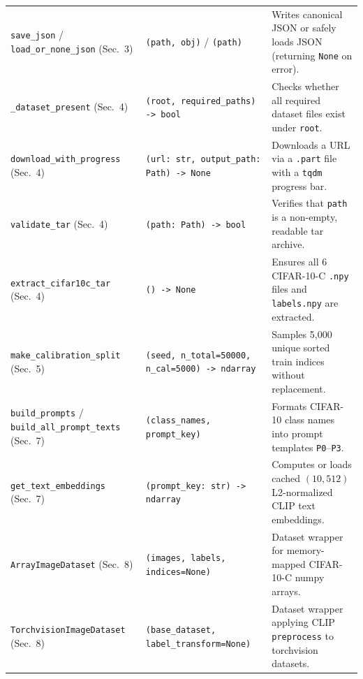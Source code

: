 \documentclass[11pt,a4paper]{article}
\begin{document}
\begin{small}
\begin{longtable}{L{0.29\textwidth} L{0.26\textwidth} L{0.36\textwidth}}
\texttt{save\_\allowbreak{}json} / \texttt{load\_\allowbreak{}or\_\allowbreak{}none\_\allowbreak{}json} (Sec.~3) & \texttt{(\allowbreak{}path,\allowbreak{} obj)} / \texttt{(\allowbreak{}path)} & Writes canonical JSON or safely loads JSON (returning \texttt{None} on error). \\
\texttt{\_\allowbreak{}dataset\_\allowbreak{}present} (Sec.~4) & \texttt{(\allowbreak{}root,\allowbreak{} required\_\allowbreak{}paths) -> bool} & Checks whether all required dataset files exist under \texttt{root}. \\
\texttt{download\_\allowbreak{}with\_\allowbreak{}progress} (Sec.~4) & \texttt{(\allowbreak{}url: str,\allowbreak{} output\_\allowbreak{}path: Path) -> None} & Downloads a URL via a \texttt{.\allowbreak{}part} file with a \texttt{tqdm} progress bar. \\
\texttt{validate\_\allowbreak{}tar} (Sec.~4) & \texttt{(\allowbreak{}path: Path) -> bool} & Verifies that \texttt{path} is a non-empty, readable tar archive. \\
\texttt{extract\_\allowbreak{}cifar10c\_\allowbreak{}tar} (Sec.~4) & \texttt{(\allowbreak{}) -> None} & Ensures all 6 CIFAR-10-C \texttt{.\allowbreak{}npy} files and \texttt{labels.\allowbreak{}npy} are extracted. \\
\texttt{make\_\allowbreak{}calibration\_\allowbreak{}split} (Sec.~5) & \texttt{(\allowbreak{}seed,\allowbreak{} n\_\allowbreak{}total=50000,\allowbreak{} n\_\allowbreak{}cal=5000) -> ndarray} & Samples 5,000 unique sorted train indices without replacement. \\
\texttt{build\_\allowbreak{}prompts} / \texttt{build\_\allowbreak{}all\_\allowbreak{}prompt\_\allowbreak{}texts} (Sec.~7) & \texttt{(\allowbreak{}class\_\allowbreak{}names,\allowbreak{} prompt\_\allowbreak{}key)} & Formats CIFAR-10 class names into prompt templates \texttt{P0}--\texttt{P3}. \\
\texttt{get\_\allowbreak{}text\_\allowbreak{}embeddings} (Sec.~7) & \texttt{(\allowbreak{}prompt\_\allowbreak{}key: str) -> ndarray} & Computes or loads cached $(10, 512)$ L2-normalized CLIP text embeddings. \\
\texttt{ArrayImageDataset} (Sec.~8) & \texttt{(\allowbreak{}images,\allowbreak{} labels,\allowbreak{} indices=None)} & Dataset wrapper for memory-mapped CIFAR-10-C numpy arrays. \\
\texttt{TorchvisionImageDataset} (Sec.~8) & \texttt{(\allowbreak{}base\_\allowbreak{}dataset,\allowbreak{} label\_\allowbreak{}transform=None)} & Dataset wrapper applying CLIP \texttt{preprocess} to torchvision datasets. \\

\end{longtable}
\end{small}
\end{document}

